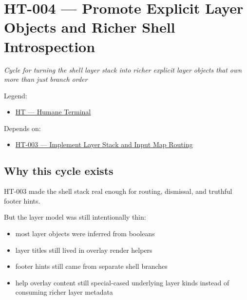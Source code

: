 \chapter{HT-004 --- Promote Explicit Layer Objects and Richer Shell Introspection}\label{record-256}

\smallskip

\emph{Cycle for turning the shell layer stack into richer explicit layer objects that own more than just branch order}

Legend:

\begin{itemize}
\tightlist
\item
  \href{https://github.com/flyingrobots/bijou/blob/1853ad902f6bf219326409e7f743a5a1d6517dbc/docs/legends/HT-humane-terminal.md}{HT --- Humane Terminal}
\end{itemize}

Depends on:

\begin{itemize}
\tightlist
\item
  \href{https://github.com/flyingrobots/bijou/blob/cbd70612140e7a450d764b3c7be1c6af878b99bc/docs/design/HT-003-implement-layer-stack-and-input-map-routing.md}{HT-003 --- Implement Layer Stack and Input Map Routing}
\end{itemize}

\section{Why this cycle exists}\label{record-256-why-this-cycle-exists}

HT-003 made the shell stack real enough for routing, dismissal, and truthful footer hints.

But the layer model was still intentionally thin:

\begin{itemize}
\tightlist
\item
  most layer objects were inferred from booleans
\item
  layer titles still lived in overlay render helpers
\item
  footer hints still came from separate shell branches
\item
  help overlay content still special-cased underlying layer kinds instead of consuming richer layer metadata
\end{itemize}

